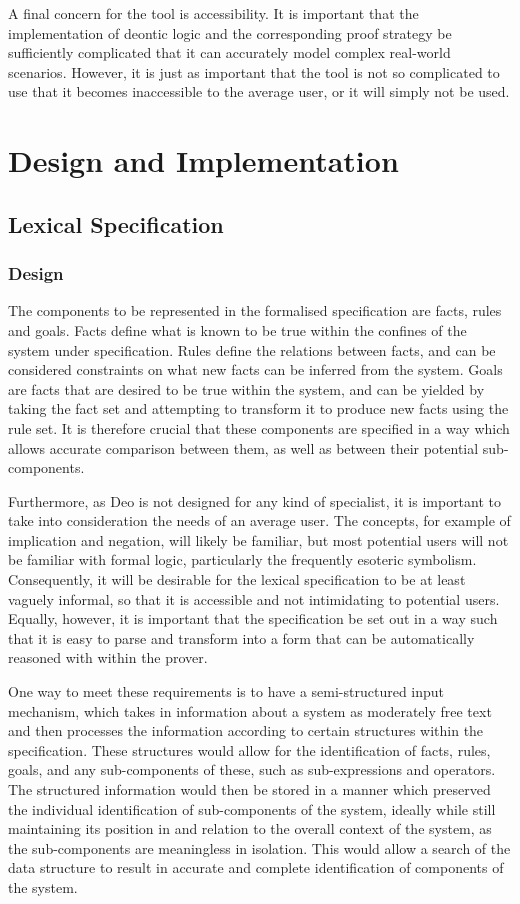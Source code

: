 \documentclass{l4proj}
\begin{document}
A final concern for the tool is accessibility. It is important that the implementation of deontic logic and the corresponding proof strategy be sufficiently complicated that it can accurately model complex real-world scenarios. However, it is just as important that the tool is not so complicated to use that it becomes inaccessible to the average user, or it will simply not be used. 

\chapter{Design and Implementation}

\section{Lexical Specification}

\subsection{Design}
The components to be represented in the formalised specification are facts, rules and goals. Facts define what is known to be true within the confines of the system under specification. Rules define the relations between facts, and can be considered constraints on what new facts can be inferred from the system. Goals are facts that are desired to be true within the system, and can be yielded by taking the fact set and attempting to transform it to produce new facts using the rule set. It is therefore crucial that these components are specified in a way which allows accurate comparison between them, as well as between their potential sub-components. 

Furthermore, as Deo is not designed for any kind of specialist, it is important to take into consideration the needs of an average user. The concepts, for example of implication and negation, will likely be familiar, but most potential users will not be familiar with formal logic, particularly the frequently esoteric symbolism. Consequently, it will be desirable for the lexical specification to be at least vaguely informal, so that it is accessible and not intimidating to potential users. Equally, however, it is important that the specification be set out in a way such that it is easy to parse and transform into a form that can be automatically reasoned with within the prover. 

One way to meet these requirements is to have a semi-structured input mechanism, which takes in information about a system as moderately free text and then processes the information according to certain structures within the specification. These structures would allow for the identification of facts, rules, goals, and any sub-components of these, such as sub-expressions and operators. The structured information would then be stored in a manner which preserved the individual identification of sub-components of the system, ideally while still maintaining its position in and relation to the overall context of the system, as the sub-components are meaningless in isolation. This would allow a search of the data structure to result in accurate and complete identification of components of the system. 
\end{document}
